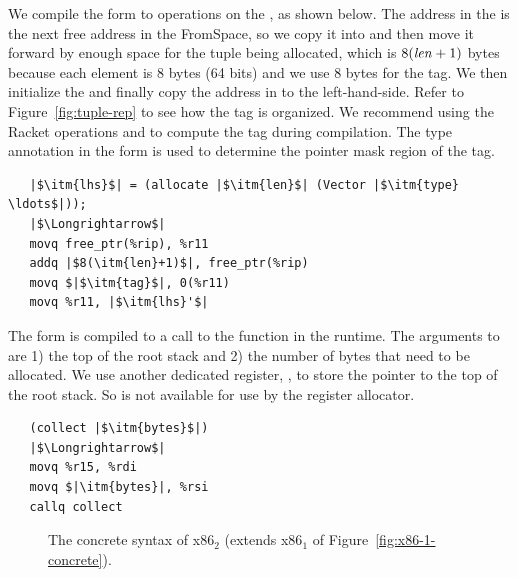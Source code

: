 \documentclass[11pt]{book}
\newcommand{\gray}[1]{{\color{gray} #1}}
\begin{document}
We compile the  form to operations on the
, as shown below. The address in the 
is the next free address in the FromSpace, so we copy it into
 and then move it forward by enough space for the tuple
being allocated, which is $8(\mathit{len}+1)$ bytes because each element
is 8 bytes (64 bits) and we use 8 bytes for the tag.  We then
initialize the  and finally copy the address in  to
the left-hand-side. Refer to Figure~\ref{fig:tuple-rep} to see how the
tag is organized. We recommend using the Racket operations
 and  to compute the tag
during compilation.  The type annotation in the  form is
used to determine the pointer mask region of the tag.
\begin{lstlisting}
   |$\itm{lhs}$| = (allocate |$\itm{len}$| (Vector |$\itm{type} \ldots$|));
   |$\Longrightarrow$|
   movq free_ptr(%rip), %r11
   addq |$8(\itm{len}+1)$|, free_ptr(%rip)
   movq $|$\itm{tag}$|, 0(%r11)
   movq %r11, |$\itm{lhs}'$|
\end{lstlisting}

The  form is compiled to a call to the 
function in the runtime. The arguments to  are 1) the
top of the root stack and 2) the number of bytes that need to be
allocated.  We use another dedicated register, , to
store the pointer to the top of the root stack. So  is not
available for use by the register allocator.
\begin{lstlisting}
   (collect |$\itm{bytes}$|)
   |$\Longrightarrow$|
   movq %r15, %rdi
   movq $|\itm{bytes}|, %rsi
   callq collect
\end{lstlisting}



\begin{figure}[tp]
\fbox{
\begin{minipage}{0.96\textwidth}
\[
\begin{array}{lcl}
  \Arg &::=& \gray{ \key{\$}\Int \mid \key{\%}\Reg \mid \Int\key{(}\key{\%}\Reg\key{)} \mid \key{\%}\itm{bytereg} } \mid \Var \key{(\%rip)} \\
x86_1 &::= & \gray{ \key{.globl main} }\\
      &    & \gray{ \key{main:} \; \Instr\ldots }
\end{array}
\]
\end{minipage}
}
\caption{The concrete syntax of x86$_2$  (extends x86$_1$ of Figure~\ref{fig:x86-1-concrete}).}
\label{fig:x86-2-concrete}
\end{figure}
\end{document}
